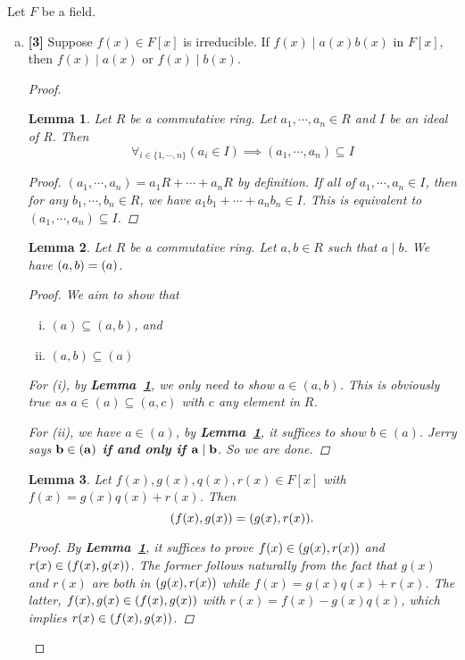 \documentclass[12pt,letterpaper]{article}
\newcommand{\pnt}[1]{\textbf{[#1]}}
\newcommand{\tot}[2]{\noindent\textsc{\footnotesize This homework is marked out of \textbf{#1} and graded out of \textbf{#2}}.}
\def\prob#1{\vskip13pt\noindent\llap{{\bf #1:\ }}}
\newtheorem{lemma}{Lemma}
\newcommand{\lparen}[1]{\large(#1\large)}
\begin{document}


\prob1 Let $F$ be a field. 
\begin{enumerate}[(a)]
        \item \pnt{3} Suppose $f(x)\in F[x]$ is irreducible. If $f(x)\mid a(x)b(x)$ in $F[x]$, then $f(x)\mid a(x)$ or $f(x)\mid b(x)$.

		\begin{proof}
			\begin{lemma}\label{hw5:1}
				Let $R$ be a commutative ring. Let $a_1,\cdots, a_n\in R$ and $I$ be an ideal of R. Then\[
				\forall_{i\in\{1,\cdots,n\}}(a_i\in I)\implies (a_1,\cdots,a_n) \subseteq I
				\]
				
				\begin{proof}
					$(a_1,\cdots,a_n)=a_1R+\cdots+a_nR$ by definition. If all of $a_1,\cdots, a_n\in I$, then for any $b_1,\cdots,b_n\in R$, we have $a_1b_1+\cdots+a_nb_n\in I$. This is equivalent to $(a_1,\cdots,a_n) \subseteq I$.
				\end{proof}
			\end{lemma}
			\begin{lemma}\label{hw5:2}
				Let $R$ be a commutative ring. Let $a,b\in R$ such that $a\mid b$. We have $\lparen{a,b}=\lparen{a}$.
				
				\begin{proof}
				We aim to show that \begin{enumerate}[(i)]
					\item $(a) \subseteq (a,b)$, and
					\item $(a,b)\subseteq (a)$
				\end{enumerate}
For (i), by \textbf{Lemma~\ref{hw5:1}}, we only need to show $a\in (a,b)$. This is obviously true as $a\in(a)\subseteq(a,c)$ with $c$ any element in $R$.

For (ii), we have $a\in(a)$, by \textbf{Lemma~\ref{hw5:1}}, it suffices to show $b\in (a)$. Jerry says \textbf{$\bf{b\in(a)}$ if and only if $\bf{a\mid b}$}. So we are done.			
					
				\end{proof}
			\end{lemma}
			\begin{lemma}\label{hw5:3}
				Let $f(x),g(x),q(x),r(x)\in F[x]$ with $f(x)=g(x)q(x)+r(x)$. Then\[
				\lparen{f(x),g(x)} = \lparen{g(x),r(x)}.
				\]
				\begin{proof}
					By \textbf{Lemma~\ref{hw5:1}}, it suffices to prove $f(x)\in \lparen{g(x),r(x)}$ and $r(x)\in \lparen{f(x),g(x)}$. The former follows naturally from the fact that $g(x)$ and $r(x)$ are both in $\lparen{g(x),r(x)}$ while $f(x)=g(x)q(x)+r(x)$. The latter, $f(x),g(x)\in \lparen{f(x),g(x)}$ with $r(x)=f(x)-g(x)q(x)$, which implies $r(x)\in \lparen{f(x),g(x)}$.
				\end{proof}
			\end{lemma}
		

\end{proof}
\end{enumerate}
\end{document}
